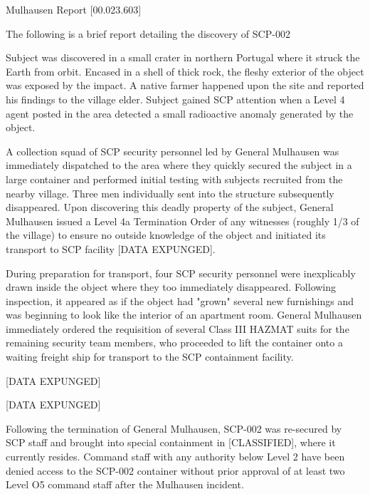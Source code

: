 \begin{leftbar}
\begin{flushleft}
Mulhausen Report [00.023.603] \linebreak
\end{flushleft}

The following is a brief report detailing the discovery of SCP-002

Subject was discovered in a small crater in northern Portugal where it struck the Earth from orbit. Encased in a shell of thick rock, the fleshy exterior of the object was exposed by the impact. A native farmer happened upon the site and reported his findings to the village elder. Subject gained SCP attention when a Level 4 agent posted in the area detected a small radioactive anomaly generated by the object.

A collection squad of SCP security personnel led by General Mulhausen was immediately dispatched to the area where they quickly secured the subject in a large container and performed initial testing with subjects recruited from the nearby village. Three men individually sent into the structure subsequently disappeared. Upon discovering this deadly property of the subject, General Mulhausen issued a Level 4a Termination Order of any witnesses (roughly 1/3 of the village) to ensure no outside knowledge of the object and initiated its transport to SCP facility [DATA EXPUNGED].

During preparation for transport, four SCP security personnel were inexplicably drawn inside the object where they too immediately disappeared. Following inspection, it appeared as if the object had "grown" several new furnishings and was beginning to look like the interior of an apartment room. General Mulhausen immediately ordered the requisition of several Class III HAZMAT suits for the remaining security team members, who proceeded to lift the container onto a waiting freight ship for transport to the SCP containment facility.

[DATA EXPUNGED]

[DATA EXPUNGED]

Following the termination of General Mulhausen, SCP-002 was re-secured by SCP staff and brought into special containment in [CLASSIFIED], where it currently resides. Command staff with any authority below Level 2 have been denied access to the SCP-002 container without prior approval of at least two Level O5 command staff after the Mulhausen incident.

\end{leftbar}
